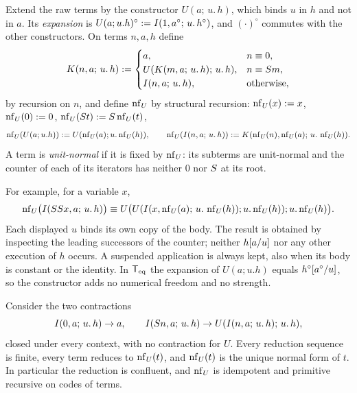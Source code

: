 \begin{definition}
\label{comp:def:unit}
Extend the raw terms by the constructor $U(a;\,u.\,h)$, which binds $u$ in
$h$ and not in $a$. Its \emph{expansion} is
$U(a;u.h)^{\circ}\mathrel{:=}I(1,a^{\circ};\,u.\,h^{\circ})$, and $(\cdot)^{\circ}$
commutes with the other constructors. On terms $n,a,h$ define
\[
 K(n,a;\,u.\,h)\mathrel{:=}
 \begin{cases}
  a, & n\equiv0,\\
  U(K(m,a;\,u.\,h);\,u.\,h), & n\equiv S m,\\
  I(n,a;\,u.\,h), & \text{otherwise},
 \end{cases}
\]
by recursion on $n$, and define $\operatorname{nf}_U$ by structural recursion:
$\operatorname{nf}_U(x)\mathrel{:=} x$, $\operatorname{nf}_U(0)\mathrel{:=}0$, $\operatorname{nf}_U(S t)\mathrel{:=}S\operatorname{nf}_U(t)$,
\[
 \operatorname{nf}_U(U(a;u.h))\mathrel{:=} U(\operatorname{nf}_U(a);u.\operatorname{nf}_U(h)),\qquad
 \operatorname{nf}_U(I(n,a;\,u.\,h))\mathrel{:=} K(\operatorname{nf}_U(n),\operatorname{nf}_U(a);\,u.\,\operatorname{nf}_U(h)).
\]
A term is \emph{unit-normal} if it is fixed by $\operatorname{nf}_U$: its subterms are
unit-normal and the counter of each of its iterators has neither $0$ nor
$S$ at its root.
\end{definition}

For example, for a variable $x$,
\[
 \operatorname{nf}_U\bigl(I(SS x,a;\,u.\,h)\bigr)\equiv
 U\bigl(U(I(x,\operatorname{nf}_U(a);\,u.\,\operatorname{nf}_U(h));u.\operatorname{nf}_U(h));u.\operatorname{nf}_U(h)\bigr).
\]
Each displayed $u$ binds its own copy of the body. The result is obtained by
inspecting the leading successors of the counter; neither $h[a/u]$
nor any other execution of $h$ occurs. A suspended application is always
kept, also when its body is constant or the identity. In $\mathsf{T}_{\mathrm{eq}}$ the
expansion of $U(a;u.h)$ equals $h^{\circ}[a^{\circ}/u]$, so the
constructor adds no numerical freedom and no strength.

\begin{lemma}
\label{comp:lem:unitrewrite}
Consider the two contractions
\[
 I(0,a;\,u.\,h)\to a,\qquad
 I(S n,a;\,u.\,h)\to U(I(n,a;\,u.\,h);\,u.\,h),
\]
closed under every context, with no contraction for $U$. Every reduction
sequence is finite, every term reduces to $\operatorname{nf}_U(t)$, and $\operatorname{nf}_U(t)$ is the
unique normal form of $t$. In particular the reduction is confluent, and
$\operatorname{nf}_U$ is idempotent and primitive recursive on codes of terms.
\end{lemma}


